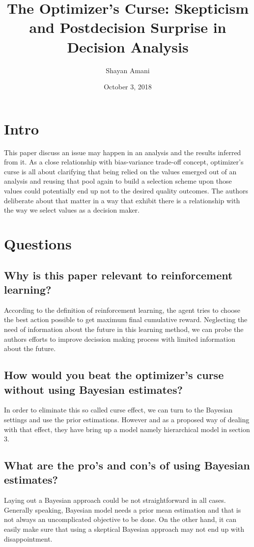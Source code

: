 \documentclass[a4paper,12pt]{article}
\title{The Optimizer’s Curse: Skepticism and
Postdecision Surprise in Decision Analysis}
\author{Shayan Amani}
\date{October 3, 2018}
\begin{document}
\maketitle

\section{Intro}
This paper discuss an issue may happen in an analysis and the results inferred from it. As a close relationship with bias-variance trade-off concept, optimizer's curse is all about clarifying that being relied on the values emerged out of an analysis and reusing that pool again to build a selection scheme upon those values could potentially end up not to the desired quality outcomes. The authors deliberate about that matter in a way that exhibit there is a relationship with the way we select values as a decision maker.


\section{Questions}

\subsection{Why is this paper relevant to reinforcement learning?}
According to the definition of reinforcement learning, the agent tries to choose the best action possible to get maximum final cumulative reward. Neglecting the need of information about the future in this learning method, we can probe the authors efforts to improve decission making process with limited information about the future.


\subsection{How would you beat the optimizer's curse without using Bayesian estimates?}
In order to eliminate this so called curse effect, we can turn to the Bayesian settings and use the prior estimations. However and as a proposed way of dealing with that effect, they have bring up a model namely hierarchical model in section 3. 


\subsection{What are the pro's and con's of using Bayesian estimates?}
Laying out a Bayesian approach could be not straightforward in all cases. Generally speaking, Bayesian model needs a prior mean estimation and that is not always an uncomplicated objective to be done. On the other hand, it can easily make sure that using a skeptical Bayesian approach may not end up with disappointment.






\end{document}
